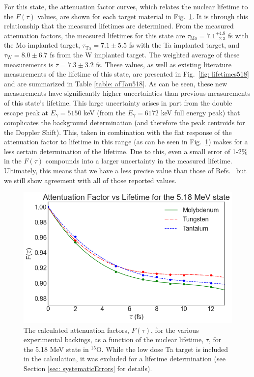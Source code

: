 For this state, the attenuation factor curves, which relates the nuclear lifetime to the $F(\tau)$ values, are shown for each target material in Fig.\ \ref{fig: attFacs518}. It is through this relationship that the measured lifetimes are determined. From the measured attenuation factors, the measured lifetimes for this state are $\tau_{\text{Mo}} = 7.1^{+4.8}_{-2.3}$ fs with the Mo implanted target, $\tau_{\text{Ta}} = 7.1 \pm 5.5$ fs with the Ta implanted target, and $\tau_{\text{W}} = 8.0 \pm 6.7$ fs from the W implanted target. The weighted average of these measurements is $\overline{\tau} = 7.3 \pm 3.2$ fs. These values, as well as existing literature measurements of the lifetime of this state, are presented in Fig.\ \ref{fig: lifetimes518} and are summarized in Table \ref{table: afTau518}. As can be seen, these new measurements have significantly higher uncertainties than previous measurements of this state's lifetime. This large uncertainty arises in part from the double escape peak at $E_{\gamma} = 5150$ keV (from the $E_{\gamma} = 6172$ keV full energy peak) that complicates the background determination (and therefore the peak centroids for the Doppler Shift). This, taken in combination with the flat response of the attenuation factor to lifetime in this range (as can be seen in Fig.\ \ref{fig: attFacs518}) makes for a less certain determination of the lifetime. Due to this, even a small error of 1-2\% in the $F(\tau)$ compounds into a larger uncertainty in the measured lifetime. Ultimately, this means that we have a less precise value than those of Refs.\ \cite{Bertone2001, Schurmann2008, Gill1968, Sharma2020} but we still show agreement with all of those reported values.


\begin{figure}
\centering
\includegraphics[width=\linewidth]{figures/attFac518.png}
\caption{The calculated attenuation factors, $F(\tau)$, for the various experimental backings, as a function of the nuclear lifetime, $\tau$, for the 5.18 MeV state in $^{15}$O. While the low dose Ta target is included in the calculation, it was excluded for a lifetime determination (see Section \ref{sec: systematicErrors} for details). }
\label{fig: attFacs518}
\end{figure}


